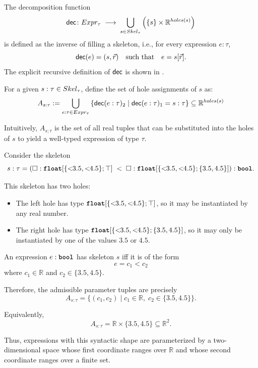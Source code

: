 \begin{definition}
	The decomposition function
	\[
		\mathsf{dec} \colon Expr_{\tau}
		\;\longrightarrow\;
		\bigcup_{s \in Skel_{\tau}} \left( \{s\} \times \mathbb{R}^{holes(s)} \right)
	\]
	is defined as the inverse of filling a skeleton, i.e., for every expression $e : \tau$,
	\[
		\mathsf{dec}(e) = (s, \vec{r})
		\quad\text{such that}\quad
		e = s[\vec{r}].
	\]
	The explicit recursive definition of $\mathsf{dec}$ is shown in .
\end{definition}



\begin{definition}
	For a given $s : \tau \in Skel_{\tau}$, define the set of hole assignments of $s$ as:
	\[
		A_{s : \tau} := 
		\bigcup_{e : \tau \in Expr_{\tau}} \left\{ \mathsf{dec}(e : \tau)_2 \mid \mathsf{dec}(e : \tau)_1 = s : \tau \right\}
		\subseteq \mathbb{R}^{holes(s)}
	\]

	Intuitively, $A_{s;\tau}$ is the set of all real tuples that can be substituted into the holes of $s$ to yield a well-typed expression of type $\tau$.
\end{definition}

\begin{example}
	Consider the skeleton
	\[
		s : \tau 
		=
		(\square : \floattype{\{\clt{3.5}, \clt{4.5}\}}{\top}
		\;<\;
		\square : \floattype{\{\clt{3.5}, \clt{4.5}\}}{\{3.5,4.5\}})
		: \bool.
	\]
	
	This skeleton has two holes:
	\begin{itemize}
		\item The left hole has type 
		$\mathnormal{\textnormal{\ttfamily\bfseries float}}[\{<\!\!{3.5}, <\!\!{4.5}\}; \top]$,
		so it may be instantiated by any real number.
		\item The right hole has type 
		$\mathnormal{\textnormal{\ttfamily\bfseries float}}[\{<\!\!{3.5}, <\!\!{4.5}\}; \{3.5,4.5\}]$,
		so it may only be instantiated by one of the values 
		$3.5$ or $4.5$.
	\end{itemize}
	
	An expression $e : \textnormal{\ttfamily\bfseries bool}$ has skeleton $s$ iff it is of the form
	\[
		e = c_1 < c_2
	\]
	where $c_1 \in \mathbb{R}$ and 
	$c_2 \in \{3.5,4.5\}$.
	
	Therefore, the admissible parameter tuples are precisely
	\[
		A_{s:\tau}
		=
		\{ (c_1,c_2) \mid c_1 \in \mathbb{R},\; c_2 \in \{3.5,4.5\} \}.
	\]
	
	Equivalently,
	\[
		A_{s:\tau}
		=
		\mathbb{R} \times \{3.5,4.5\}
		\subseteq
		\mathbb{R}^2.
	\]
	
	Thus, expressions with this syntactic shape are parameterized by a two-dimensional space whose first coordinate ranges over $\mathbb{R}$ and whose second coordinate ranges over a finite set.
\end{example}

